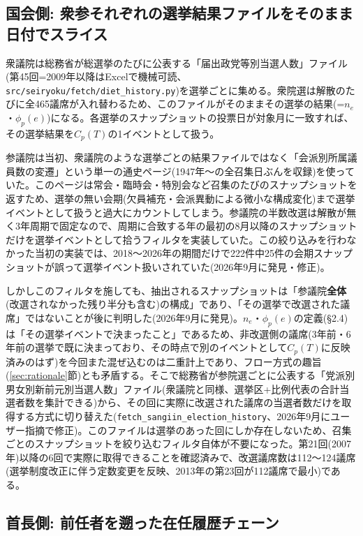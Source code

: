 \documentclass[a4paper,11pt]{ltjsarticle}
\begin{document}
\subsection{国会側: 衆参それぞれの選挙結果ファイルをそのまま日付でスライス}

衆議院は総務省が総選挙のたびに公表する「届出政党等別当選人数」ファイル(第45回=2009年以降はExcelで機械可読、\texttt{src/seiryoku/fetch/diet\_history.py})を選挙ごとに集める。衆院選は解散のたびに全465議席が入れ替わるため、このファイルがそのままその選挙の結果(=$n_e$・$\phi_p(e)$)になる。各選挙のスナップショットの投票日が対象月に一致すれば、その選挙結果を$C_p(T)$の1イベントとして扱う。

参議院は当初、衆議院のような選挙ごとの結果ファイルではなく「会派別所属議員数の変遷」という単一の通史ページ(1947年〜の全召集日ぶんを収録)を使っていた。このページは常会・臨時会・特別会など召集のたびのスナップショットを返すため、選挙の無い会期(欠員補充・会派異動による微小な構成変化)まで選挙イベントとして扱うと過大にカウントしてしまう。参議院の半数改選は解散が無く3年周期で固定なので、周期に合致する年の最初の8月以降のスナップショットだけを選挙イベントとして拾うフィルタを実装していた。この絞り込みを行わなかった当初の実装では、2018〜2026年の期間だけで222件中25件の会期スナップショットが誤って選挙イベント扱いされていた(2026年9月に発見・修正)。

しかしこのフィルタを施しても、抽出されるスナップショットは「参議院\textbf{全体}(改選されなかった残り半分も含む)の構成」であり、「その選挙で改選された議席」ではないことが後に判明した(2026年9月に発見)。$n_e$・$\phi_p(e)$の定義(\S2.4)は「その選挙イベントで決まったこと」であるため、非改選側の議席(3年前・6年前の選挙で既に決まっており、その時点で別のイベントとして$C_p(T)$に反映済みのはず)を今回また混ぜ込むのは二重計上であり、フロー方式の趣旨(\ref{sec:rationale}節)とも矛盾する。そこで総務省が参院選ごとに公表する「党派別男女別新前元別当選人数」ファイル(衆議院と同様、選挙区+比例代表の合計当選者数を集計できる)から、その回に実際に改選された議席の当選者数だけを取得する方式に切り替えた(\texttt{fetch\_sangiin\_election\_history}、2026年9月にユーザー指摘で修正)。このファイルは選挙のあった回にしか存在しないため、召集ごとのスナップショットを絞り込むフィルタ自体が不要になった。第21回(2007年)以降の6回で実際に取得できることを確認済みで、改選議席数は112〜124議席(選挙制度改正に伴う定数変更を反映、2013年の第23回が112議席で最小)である。

\subsection{首長側: 前任者を遡った在任履歴チェーン}
\end{document}
